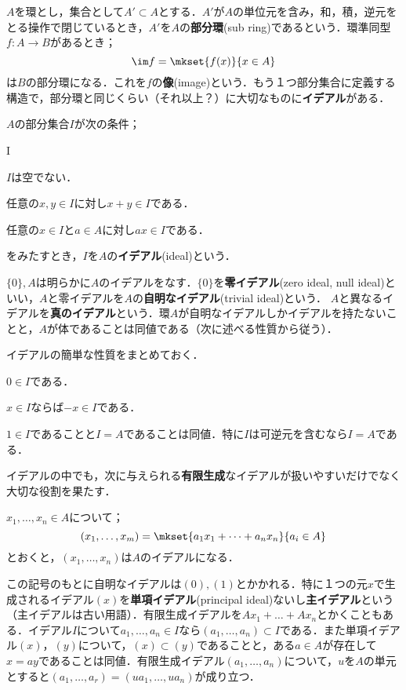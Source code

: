 $A$を環とし，集合として$A'\subset A$とする．$A'$が$A$の単位元を含み，和，積，逆元をとる操作で閉じているとき，$A'$を$A$の\textbf{部分環}(sub ring)であるという．環準同型$f:A\to B$があるとき；
\[\im f=\mkset{f(x)}{x\in A}\]
は$B$の部分環になる．これを$f$の\textbf{像}(image)という．もう１つ部分集合に定義する構造で，部分環と同じくらい（それ以上？）に大切なものに\textbf{イデアル}がある．

\begin{defi}[イデアル]
	$A$の部分集合$I$が次の条件；
	\begin{defiterm}{I}
		\item $I$は空でない．
		\item 任意の$x,y\in I$に対し$x+y\in I$である．
		\item 任意の$x\in I$と$a\in A$に対し$ax\in I$である．
	\end{defiterm}
	をみたすとき，$I$を$A$の\textbf{イデアル}(ideal)という．
\end{defi}

$\{0\},A$は明らかに$A$のイデアルをなす．$\{0\}$を\textbf{零イデアル}(zero ideal, null ideal)といい，$A$と零イデアルを$A$の\textbf{自明なイデアル}(trivial ideal)という． $A$と異なるイデアルを\textbf{真のイデアル}という．環$A$が自明なイデアルしかイデアルを持たないことと，$A$が体であることは同値である（次に述べる性質から従う）．

イデアルの簡単な性質をまとめておく．
\begin{sakura}
	\item $0\in I$である．
	\item $x\in I$ならば$-x\in I$である．
	\item $1\in I$であることと$I=A$であることは同値．特に$I$は可逆元を含むなら$I=A$である．
\end{sakura}

イデアルの中でも，次に与えられる\textbf{有限生成}なイデアルが扱いやすいだけでなく大切な役割を果たす．

\begin{defi}[有限生成イデアル]
	$x_1,\dots,x_n\in A$について；
	\[(x_1,\dots,x_m)=\mkset{a_1x_1+\dots+a_nx_n}{a_i\in A}\]
	とおくと，$(x_1,\dots,x_n)$は$A$のイデアルになる．
\end{defi}

この記号のもとに自明なイデアルは$(0),(1)$とかかれる．特に１つの元$x$で生成されるイデアル$(x)$を\textbf{単項イデアル}(principal ideal)ないし\textbf{主イデアル}という（主イデアルは古い用語）．有限生成イデアルを$Ax_1+\dots+Ax_n$とかくこともある．イデアル$I$について$a_1,\dots,a_n\in I$なら$(a_1,\dots,a_n)\subset I$である．また単項イデアル$(x)，(y)$について，$(x)\subset (y)$であることと，ある$a\in A$が存在して$x=ay$であることは同値．有限生成イデアル$(a_1,\dots,a_n)$について，$u$を$A$の単元とすると$(a_1,\dots,a_r)=(ua_1,\dots,ua_n)$が成り立つ．

